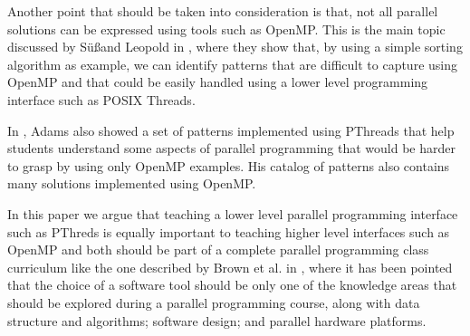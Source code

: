 Another point that should be taken into consideration is that, not all
parallel solutions can be expressed using tools such as OpenMP. This is the
main topic discussed by Sü\ss and Leopold in \cite{Leopold:userOpenMP}, where
they show that, by using a simple sorting algorithm as example, we can identify
patterns that are difficult to capture using OpenMP and that could be easily
handled using a lower level programming interface such as POSIX Threads.

In \cite{ADAMS201731}, Adams also showed a set of patterns implemented using
PThreads that help students understand some aspects of parallel programming
that would be harder to grasp by using only OpenMP examples. His catalog of
patterns also contains many solutions implemented using OpenMP.

In this paper we argue that teaching a lower level parallel programming
interface such as PThreds is equally important to teaching higher level
interfaces such as OpenMP and both should be part of a complete parallel
programming class curriculum like the one described by Brown et al. in
\cite{Brown:2010:SPC:1971681.1971689}, where it has been pointed that the
choice of a software tool should be only one of the knowledge areas that should
be explored during a parallel programming course, along with data structure and
algorithms; software design; and parallel hardware platforms.

